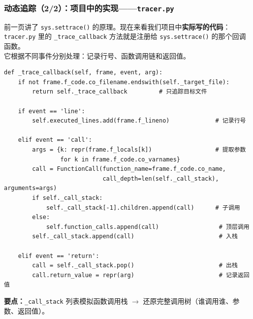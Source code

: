 \documentclass[presentation,aspectratio=169]{ctexbeamer}
\begin{document}
\begin{frame}[fragile]
\frametitle{动态追踪（2/2）：项目中的实现——\texttt{tracer.py}}
{\footnotesize 前一页讲了 \texttt{sys.settrace()} 的原理。现在来看我们项目中\textbf{实际写的代码}：\\
\texttt{tracer.py} 里的 \texttt{\_trace\_callback} 方法就是注册给 \texttt{sys.settrace()} 的那个回调函数。\\
它根据不同事件分别处理：记录行号、函数调用链和返回值。}

\vspace{0.05cm}
{\tiny
\begin{verbatim}
def _trace_callback(self, frame, event, arg):
    if not frame.f_code.co_filename.endswith(self._target_file):
        return self._trace_callback         # 只追踪目标文件

    if event == 'line':
        self.executed_lines.add(frame.f_lineno)             # 记录行号

    elif event == 'call':
        args = {k: repr(frame.f_locals[k])                  # 提取参数
                for k in frame.f_code.co_varnames}
        call = FunctionCall(function_name=frame.f_code.co_name,
                            call_depth=len(self._call_stack), arguments=args)
        if self._call_stack:
            self._call_stack[-1].children.append(call)      # 子调用
        else:
            self.function_calls.append(call)                 # 顶层调用
        self._call_stack.append(call)                        # 入栈

    elif event == 'return':
        call = self._call_stack.pop()                        # 出栈
        call.return_value = repr(arg)                        # 记录返回值
\end{verbatim}}

\vspace{0.05cm}
{\footnotesize\textbf{要点：}\texttt{\_call\_stack} 列表模拟函数调用栈 $\rightarrow$ 还原完整调用树（谁调用谁、参数、返回值）。}
\end{frame}

\end{document}
